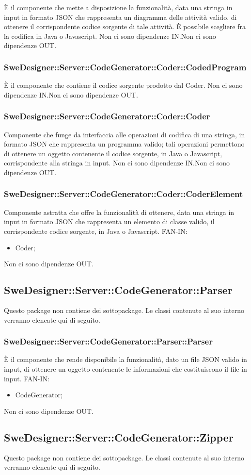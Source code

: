 \documentclass[../PianoDiQualifica.tex]{subfiles}
\begin{document}
		È il componente che mette a disposizione la funzionalità, data una stringa in input in formato JSON che rappresenta un diagramma delle attività valido, di ottenere il corrispondente codice sorgente di tale attività. È possibile scegliere fra la codifica in Java o Javascript.
		Non ci sono dipendenze IN.Non ci sono dipendenze OUT.\subsubsection{SweDesigner::Server::CodeGenerator::Coder::CodedProgram}
		È il componente che contiene il codice sorgente prodotto dal Coder.
		Non ci sono dipendenze IN.Non ci sono dipendenze OUT.\subsubsection{SweDesigner::Server::CodeGenerator::Coder::Coder}
		Componente che funge da interfaccia alle operazioni di codifica di una stringa, in formato JSON che rappresenta un programma valido; tali operazioni permettono di ottenere un oggetto contenente il codice sorgente, in Java o Javascript, corrispondente alla stringa in input.
		Non ci sono dipendenze IN.Non ci sono dipendenze OUT.\subsubsection{SweDesigner::Server::CodeGenerator::Coder::CoderElement}
		Componente astratta che offre la funzionalità di ottenere, data una stringa in input in formato JSON che rappresenta un elemento di classe valido, il corrispondente codice sorgente, in Java o Javascript.
		FAN-IN:
		\begin{itemize}
			\item Coder;
		\end{itemize}
		Non ci sono dipendenze OUT.\subsection{SweDesigner::Server::CodeGenerator::Parser}
		Questo package non contiene dei sottopackage.
		Le classi contenute al suo interno verranno elencate qui di seguito.
		\subsubsection{SweDesigner::Server::CodeGenerator::Parser::Parser}
		È il componente che rende disponibile la funzionalità, dato un file JSON valido in input, di ottenere un oggetto contenente le informazioni che costituiscono il file in input.
		FAN-IN:
		\begin{itemize}
			\item CodeGenerator;
		\end{itemize}
		Non ci sono dipendenze OUT.\subsection{SweDesigner::Server::CodeGenerator::Zipper}
		Questo package non contiene dei sottopackage.
		Le classi contenute al suo interno verranno elencate qui di seguito.
\end{document}
